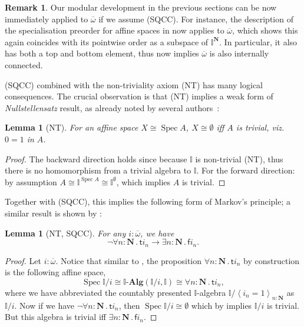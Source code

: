\documentclass[a4paper,12pt]{amsart}
\newtheorem{lemma}[theorem]{Lemma}
\theoremstyle{definition}
\newtheorem{remark}[theorem]{Remark}
\newcommand{\mb}[1]{\mathbf{#1}}
\newcommand{\mbb}[1]{\mathbb{#1}}
\newcommand{\I}{\mbb I}
\newcommand{\ms}[1]{\mathsf{#1}}
\newcommand{\alg}{\text{-}\mb{Alg}}
\newcommand{\ov}[1]{\overline{#1}}
\newcommand{\pair}[1]{\left\langle#1\right\rangle}
\newcommand{\N}{\mb N}
\newcommand{\fa}[2]{\forall #1\!\colon\!\!#2\mathpunct{.}}
\newcommand{\ex}[2]{\exists #1\!\colon\!\!#2\mathpunct{.}}
\newcommand{\emp}{\emptyset}
\newcommand{\spec}{\operatorname{Spec}}
\begin{document}
\begin{remark}
  Our modular development in the previous sections can be now immediately applied to $\ov\omega$ if we assume (SQCC). For instance, the description of the specialisation preorder for affine spaces in  now applies to $\ov\omega$, which shows this again coincides with its pointwise order as a subspace of $\I^\N$. In particular, it also has both a top and bottom element, thus  now implies $\ov\omega$ is also internally connected. 
\end{remark}

(SQCC) combined with the non-triviality axiom (NT) has many logical consequences. The crucial observation is that (NT) implies a weak form of \emph{Nullstellensatz} result, as already noted by several authors~\citep{blechschmidt2021using,blechschmidt2020general,Cherubini_Coquand_Hutzler_2024}:

\begin{lemma}[NT]\label{lem:nulls}
  For an affine space $X \cong \spec A$, $X \cong \emp$ iff $A$ is trivial, viz.\ $0=1$ in $A$.
\end{lemma}
\begin{proof}
  The backward direction holds since because $\I$ is non-trivial (NT), thus there is no homomorphism from a trivial algebra to $\I$. For the forward direction: by assumption $A \cong \I^{\spec A} \cong \I^\emp$, which implies $A$ is trivial. 
\end{proof}

Together with (SQCC), this implies the following form of Markov's principle; a similar result is shown by \citet{cherubini2024foundation}:

\begin{lemma}[NT, SQCC]\label{lem:markov}
  For any $i : \ov\omega$, we have
  \[ \neg\fa{n}{\N}\ms ti_n \to \ex n\N\ms fi_n. \]
\end{lemma}
\begin{proof}
  Let $i : \ov\omega$. Notice that similar to , the proposition $\fa n\N \ms ti_n$ by construction is the following affine space, 
  \[ \spec\I/i \cong \I\alg(\I/i,\I) \cong \fa n\N \ms ti_n, \]
  where we have abbreviated the countably presented $\I$-algebra $\I/\pair{i_n=1}_{n:\N}$ as $\I/i$. Now if we have $\neg\fa n\N \ms ti_n$, then $\spec\I/i \cong \emp$ which by  implies $\I/i$ is trivial. But this algebra is trivial iff $\ex n\N \ms fi_n$.
\end{proof}
\end{document}
